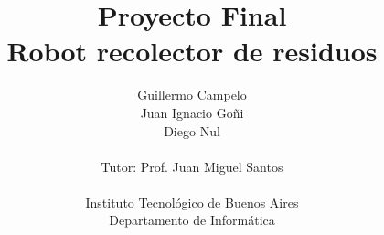 \documentclass[a4paper,10pt]{article}
\title{Proyecto Final\\Robot recolector de residuos}
\author{Guillermo Campelo\\Juan Ignacio Go\~ni\\Diego Nul\\ \\Tutor: Prof. Juan Miguel Santos\\ \\Instituto Tecnol\'ogico de Buenos Aires\\Departamento de Inform\'atica}
\begin{document}
\maketitle



\newpage

\tableofcontents

\newpage

\listoftables

\newpage

\listoffigures

\newpage



\newpage



\newpage



\newpage



\newpage



\newpage



\newpage



\nocite{*}


\end{document}
